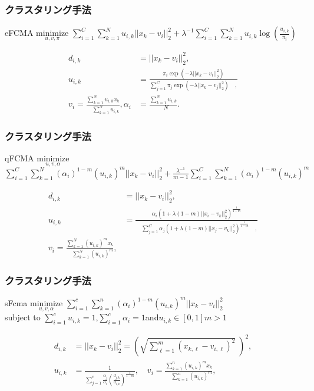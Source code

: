 \documentclass[13pt,dvipdfmx]{beamer}
\begin{document}
\begin{frame}\frametitle{クラスタリング手法}
 \begin{block}{eFCMA}
  $\underset{u,v,\pi}{\text{minimize}}$
  $\sum_{i=1}^C\sum_{k=1}^Nu_{i,k}||x_k-v_i||_2^2+\lambda^{-1}\sum_{i=1}^C\sum_{k=1}^Nu_{i,k}\log(\frac{u_{i,k}}{\pi_{i}})$\centering\\
 \end{block}
\begin{align*}
 d_{i,k}&=||x_{k}-v_{i}||_{2}^2, \\
 u_{i,k}&=\frac{\pi_{i}\exp(-\lambda||x_k-v_i||_2^2)}{\sum_{j=1}^C\pi_{j}\exp(-\lambda||x_k-v_j||_2^2)\quad,}\\
 v_{i}=\frac{\sum_{k=1}^Nu_{i,k}x_{k}}{\quad\sum_{k=1}^Nu_{i,k}},
 \alpha_{i}&=\frac{\sum_{k=1}^Nu_{i,k}}{\quad N}.
\end{align*}
\end{frame}

\begin{frame}\frametitle{クラスタリング手法}
 \begin{block}{qFCMA}
  $\underset{u,v,\alpha}{\text{minimize}}$
  $\sum_{i=1}^C\sum_{k=1}^N(\alpha_{i})^{1-m}(u_{i,k})^m||x_k-v_i||_2^2+\frac{\lambda^{-1}}{m-1}\sum_{i=1}^C\sum_{k=1}^N(\alpha_{i})^{1-m}(u_{i,k})^m$\centering\\
 \end{block}
 \begin{align*}
  d_{i,k}&=||x_{k}-v_{i}||_{2}^2, \\
  u_{i,k}&=\frac{\alpha_{i}(1+\lambda(1-m)||x_i-v_k||_2^2)^\frac{1}{1-m}}{\quad\sum_{j=1}^C\alpha_{j}(1+\lambda(1-m)||x_j-v_k||_2^2)^\frac{1}{1-m}\quad,}\\
  v_{i}=\frac{\sum_{k=1}^N(u_{i,k})^mx_{k}}{\quad\sum_{k=1}^N(u_{i,k})^{m}},
 \end{align*}
\end{frame}

\begin{frame}\frametitle{クラスタリング手法}
 \begin{block}{sFcma}
  $\underset{u,v,\alpha}{\text{minimize}}$
  $\sum_{i=1}^c\sum_{k=1}^n(\alpha_{i})^{1-m}(u_{i,k})^m||x_k-v_i||_2^2$\\
  subject \; to \; $\sum_{i=1}^cu_{i,k}=1$\;,\;$\sum_{i=1}^c\alpha_{i}=1$\;and\;$u_{i,k}\in[0,1]$\quad$m>1$
 \end{block}
 \begin{align*}
  d_{i,k}&=||x_{k}-v_{i}||_{2}^2=\left(\sqrt{\sum_{\ell=1}^m (x_{k,\ell}-v_{i,\ell})^2}\;\right)^2,\\
  u_{i,k}&=\frac{1}{\sum_{j=1}^c\frac{\alpha_{j}}{\alpha_{i}}\left(\frac{d_{j,k}}{d_{i,k}}\right)^\frac{1}{1-m}},\quad
  v_{i}=\frac{\sum_{k=1}^n(u_{i,k})^mx_{k}}{\quad\sum_{k=1}^n(u_{i,k})^{m}},\\
 \end{align*}
\end{frame}
\end{document}
